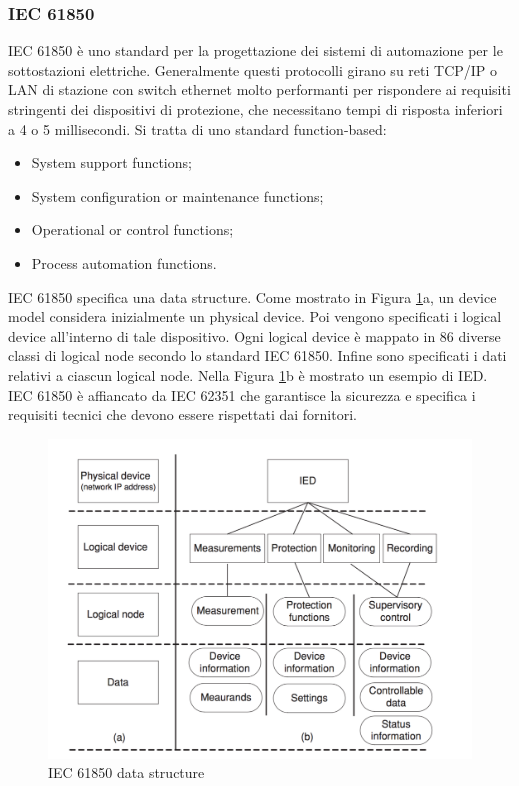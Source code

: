 \subsubsection{IEC 61850}
IEC 61850 è uno standard per la progettazione dei sistemi di automazione per le sottostazioni elettriche. Generalmente questi protocolli girano su reti TCP/IP o LAN di stazione con switch ethernet molto performanti per rispondere ai requisiti stringenti dei dispositivi di protezione, che necessitano tempi di risposta inferiori a 4 o 5 millisecondi. Si tratta di uno standard function-based:
\begin{itemize}
	\item System support functions;
	\item System configuration or maintenance functions;
	\item Operational or control functions;
	\item Process automation functions.
\end{itemize}
IEC 61850 specifica una data structure. Come mostrato in Figura \ref{fig:iec61850}a, un device model considera inizialmente un physical device. Poi vengono specificati i logical device all'interno di tale dispositivo. Ogni logical device è mappato in 86 diverse classi di logical node secondo lo standard IEC 61850. Infine sono specificati i dati relativi a ciascun logical node. Nella Figura \ref{fig:iec61850}b è mostrato un esempio di IED. IEC 61850 è affiancato da IEC 62351 che garantisce la sicurezza e specifica i requisiti tecnici che devono essere rispettati dai fornitori.
\begin{figure}[h]
	\centering
	\includegraphics[scale=0.350]{imgs/iec61850.png}
	\caption{IEC 61850 data structure} \label{fig:iec61850}
\end{figure}\\
